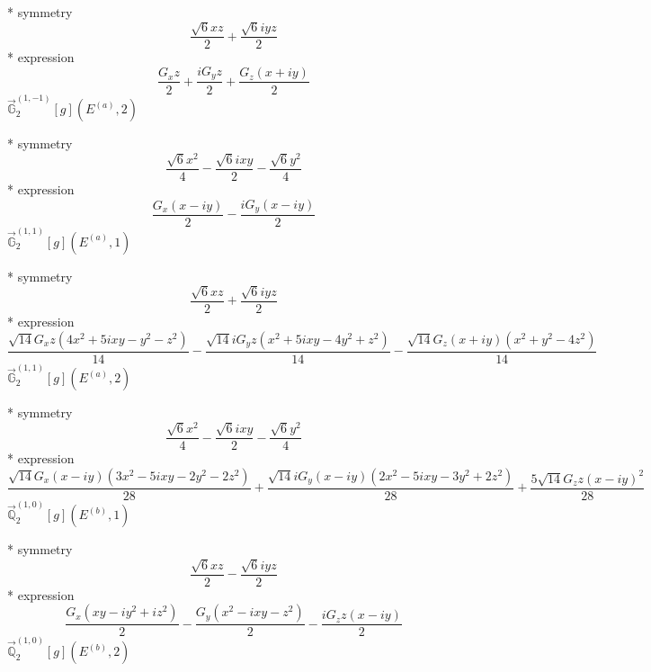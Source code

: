 \documentclass[fleqn,8pt]{jsarticle}
\begin{document}
\noindent\quad ** symmetry
\begin{dmath*}
\frac{\sqrt{6} x z}{2} + \frac{\sqrt{6} i y z}{2}
\end{dmath*}
\noindent\quad ** expression
\begin{dmath*}
\frac{G_{x} z}{2} + \frac{i G_{y} z}{2} + \frac{G_{z} \left(x + i y\right)}{2}
\end{dmath*}
\noindent\quad $\vec{\mathbb{G}}_{2}^{(1,-1)}[g](E^{(a)},2)$

\noindent\quad ** symmetry
\begin{dmath*}
\frac{\sqrt{6} x^{2}}{4} - \frac{\sqrt{6} i x y}{2} - \frac{\sqrt{6} y^{2}}{4}
\end{dmath*}
\noindent\quad ** expression
\begin{dmath*}
\frac{G_{x} \left(x - i y\right)}{2} - \frac{i G_{y} \left(x - i y\right)}{2}
\end{dmath*}
\noindent\quad $\vec{\mathbb{G}}_{2}^{(1,1)}[g](E^{(a)},1)$

\noindent\quad ** symmetry
\begin{dmath*}
\frac{\sqrt{6} x z}{2} + \frac{\sqrt{6} i y z}{2}
\end{dmath*}
\noindent\quad ** expression
\begin{dmath*}
\frac{\sqrt{14} G_{x} z \left(4 x^{2} + 5 i x y - y^{2} - z^{2}\right)}{14} - \frac{\sqrt{14} i G_{y} z \left(x^{2} + 5 i x y - 4 y^{2} + z^{2}\right)}{14} - \frac{\sqrt{14} G_{z} \left(x + i y\right) \left(x^{2} + y^{2} - 4 z^{2}\right)}{14}
\end{dmath*}
\noindent\quad $\vec{\mathbb{G}}_{2}^{(1,1)}[g](E^{(a)},2)$

\noindent\quad ** symmetry
\begin{dmath*}
\frac{\sqrt{6} x^{2}}{4} - \frac{\sqrt{6} i x y}{2} - \frac{\sqrt{6} y^{2}}{4}
\end{dmath*}
\noindent\quad ** expression
\begin{dmath*}
\frac{\sqrt{14} G_{x} \left(x - i y\right) \left(3 x^{2} - 5 i x y - 2 y^{2} - 2 z^{2}\right)}{28} + \frac{\sqrt{14} i G_{y} \left(x - i y\right) \left(2 x^{2} - 5 i x y - 3 y^{2} + 2 z^{2}\right)}{28} + \frac{5 \sqrt{14} G_{z} z \left(x - i y\right)^{2}}{28}
\end{dmath*}
\noindent\quad $\vec{\mathbb{Q}}_{2}^{(1,0)}[g](E^{(b)},1)$

\noindent\quad ** symmetry
\begin{dmath*}
\frac{\sqrt{6} x z}{2} - \frac{\sqrt{6} i y z}{2}
\end{dmath*}
\noindent\quad ** expression
\begin{dmath*}
\frac{G_{x} \left(x y - i y^{2} + i z^{2}\right)}{2} - \frac{G_{y} \left(x^{2} - i x y - z^{2}\right)}{2} - \frac{i G_{z} z \left(x - i y\right)}{2}
\end{dmath*}
\noindent\quad $\vec{\mathbb{Q}}_{2}^{(1,0)}[g](E^{(b)},2)$
\end{document}

